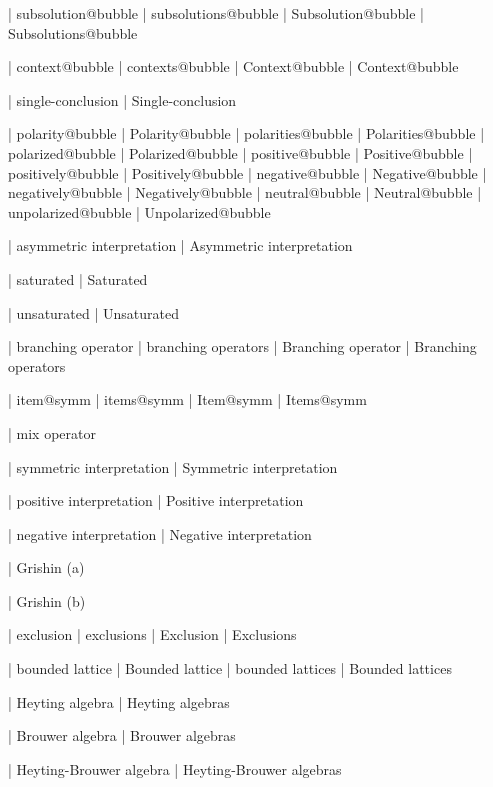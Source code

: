  | subsolution@bubble
 | subsolutions@bubble
 | Subsolution@bubble
 | Subsolutions@bubble

 | context@bubble
 | contexts@bubble
 | Context@bubble
 | Context@bubble

 | single-conclusion
 | Single-conclusion

 | polarity@bubble
 | Polarity@bubble
 | polarities@bubble
 | Polarities@bubble
 | polarized@bubble
 | Polarized@bubble
 | positive@bubble
 | Positive@bubble
 | positively@bubble
 | Positively@bubble
 | negative@bubble
 | Negative@bubble
 | negatively@bubble
 | Negatively@bubble
 | neutral@bubble
 | Neutral@bubble
 | unpolarized@bubble
 | Unpolarized@bubble

 | asymmetric interpretation
 | Asymmetric interpretation

 | saturated
 | Saturated

 | unsaturated
 | Unsaturated

 | branching operator
 | branching operators
 | Branching operator
 | Branching operators

 | item@symm
 | items@symm
 | Item@symm
 | Items@symm

 | mix operator
 
 | symmetric interpretation
 | Symmetric interpretation

 | positive interpretation
 | Positive interpretation

 | negative interpretation
 | Negative interpretation

 | Grishin (a)

 | Grishin (b)

 | exclusion
 | exclusions
 | Exclusion
 | Exclusions
 
 | bounded lattice
 | Bounded lattice
 | bounded lattices
 | Bounded lattices

 | Heyting algebra
 | Heyting algebras

 | Brouwer algebra
 | Brouwer algebras

 | Heyting-Brouwer algebra
 | Heyting-Brouwer algebras


